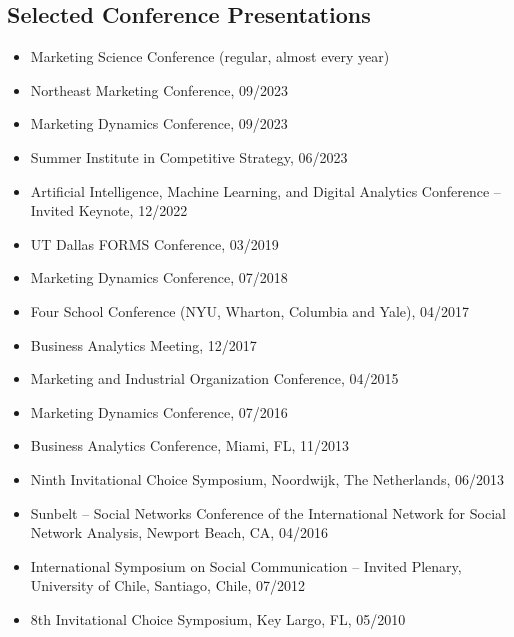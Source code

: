 \documentclass[margin, line, centered, 10pt]{res}
\begin{document}
\begin{resume}
\section{\sc Selected Conference Presentations}
\begin{itemize}
\item Marketing Science Conference (regular, almost every year)
\item Northeast Marketing Conference, 09/2023
\item Marketing Dynamics Conference, 09/2023
\item Summer Institute in Competitive Strategy, 06/2023
\item Artificial Intelligence, Machine Learning, and Digital Analytics Conference – Invited Keynote, 12/2022
\item UT Dallas FORMS Conference, 03/2019
\item Marketing Dynamics Conference, 07/2018
\item Four School Conference (NYU, Wharton, Columbia and Yale), 04/2017
\item Business Analytics Meeting, 12/2017
\item Marketing and Industrial Organization Conference, 04/2015
\item Marketing Dynamics Conference, 07/2016
\item Business Analytics Conference, Miami, FL, 11/2013
\item Ninth Invitational Choice Symposium, Noordwijk, The Netherlands, 06/2013
\item Sunbelt – Social Networks Conference of the International Network for Social Network Analysis, Newport Beach, CA, 04/2016
\item International Symposium on Social Communication – Invited Plenary, University of Chile, Santiago, Chile, 07/2012
\item 8th Invitational Choice Symposium, Key Largo, FL, 05/2010
\end{itemize}



\end{resume}
\end{document}
